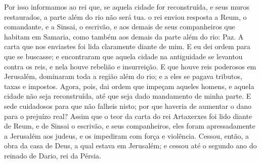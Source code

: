 {Por isso informamos ao rei que, se aquela cidade for reconstruída, e seus muros restaurados, a parte além do rio não será tua.
 o rei enviou
{} resposta a Reum, o comandante, e a Sinsai, o escrivão, e aos demais de seus companheiros que habitam em Samaria, como também aos demais da parte além do rio: Paz.
A carta que nos enviastes foi lida claramente diante de mim.
E eu dei ordem para que se buscasse; e encontraram que aquela cidade na antiguidade se levantou contra os reis, e nela houve rebelião e insurreição.
E que houve reis poderosos em Jerusalém, dominaram toda a região além do rio; e a eles se pagava tributos, taxas e impostos.
Agora, pois, dai ordem que impeçam aqueles homens, e aquela cidade não seja reconstruída, até que seja dado mandamento de minha parte.
E sede cuidadosos para que não falheis nisto; por que haveria de aumentar o dano para o prejuízo real?
Assim que o teor da carta do rei Artaxerxes foi lido diante de Reum, e de Sinsai o escrivão, e seus companheiros, eles foram apressadamente a Jerusalém aos judeus, e os impediram com força e violência.
Cessou, então, a obra da casa de Deus, a qual estava em Jerusalém; e cessou até o segundo ano do reinado de Dario, rei da Pérsia.

}
